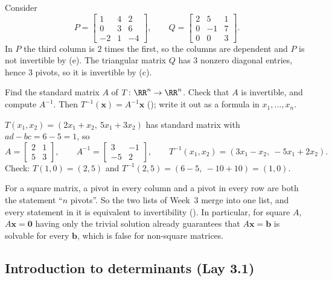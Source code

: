 \documentclass[10pt]{scrartcl}
\newcommand{\vv}[1]{\mathbf{#1}}
\begin{document}
\begin{example*}
Consider
\[
  P=\begin{bmatrix}1&4&2\\0&3&6\\-2&1&-4\end{bmatrix},\qquad Q=\begin{bmatrix}2&5&1\\0&-1&7\\0&0&3\end{bmatrix}.
\]
In $P$ the third column is $2$ times the first, so the columns are dependent and $P$ is not invertible by (e). The triangular matrix $Q$ has $3$ nonzero diagonal entries, hence $3$ pivots, so it is invertible by (c).
\end{example*}

\begin{steps}
  \ii Find the standard matrix $A$ of $T\colon\RR^n\to\RR^n$.
  \ii Check that $A$ is invertible, and compute $A^{-1}$.
  \ii Then $T^{-1}(\vv x)=A^{-1}\vv x$ (); write it out as a formula in $x_1,\dots,x_n$.
\end{steps}

\begin{example*}
$T(x_1,x_2)=(2x_1+x_2,\ 5x_1+3x_2)$ has standard matrix with $ad-bc=6-5=1$, so
\[
  A=\begin{bmatrix}2&1\\5&3\end{bmatrix},\qquad A^{-1}=\begin{bmatrix}3&-1\\-5&2\end{bmatrix},\qquad T^{-1}(x_1,x_2)=(3x_1-x_2,\ -5x_1+2x_2).
\]
Check: $T(1,0)=(2,5)$ and $T^{-1}(2,5)=(6-5,\ -10+10)=(1,0)$.
\end{example*}

\revisit
For a square matrix, a pivot in every column and a pivot in every row are both the statement ``$n$ pivots''. So the two lists of Week~3 merge into one list, and every statement in it is equivalent to invertibility (). In particular, for square $A$, $A\vv x=\vv 0$ having only the trivial solution already guarantees that $A\vv x=\vv b$ is solvable for every $\vv b$, which is false for non-square matrices.

\subsection{Introduction to determinants (Lay 3.1)}
\end{document}
